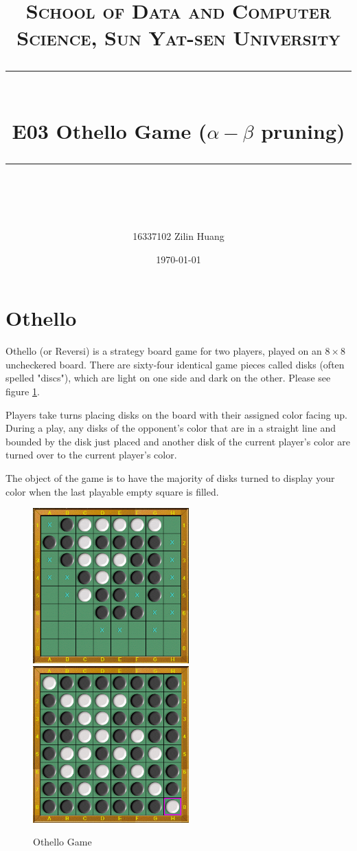 ﻿\documentclass[a4paper, 11pt]{article}
\title{	
\normalfont \normalsize
\textsc{School of Data and Computer Science, Sun Yat-sen University} \\ [25pt] %
\rule{\textwidth}{0.5pt} \\[0.4cm] %
\huge  E03 Othello Game ($\alpha-\beta$ pruning) \\ %
\rule{\textwidth}{2pt} \\[0.5cm] %
\author{16337102 Zilin Huang}
\date{\normalsize\today}
}
\begin{document}
\maketitle
\tableofcontents
\newpage

\section{Othello}
Othello (or Reversi) is a strategy board game for two players, played on an $8 \times 8$ uncheckered board. There are sixty-four identical game pieces called disks (often spelled "discs"), which are light on one side and dark on the other. Please see figure \ref{fig:othello}.

Players take turns placing disks on the board with their assigned color facing up. During a play, any disks of the opponent's color that are in a straight line and bounded by the disk just placed and another disk of the current player's color are turned over to the current player's color.

The object of the game is to have the majority of disks turned to display your color when the last playable empty square is filled.
\begin{figure}
  \centering
  \includegraphics[width=6cm]{Pic/othello}
  \qquad
  \includegraphics[width=6cm]{Pic/othello2}
  \caption{Othello Game}
  \label{fig:othello}
\end{figure}
\end{document}
